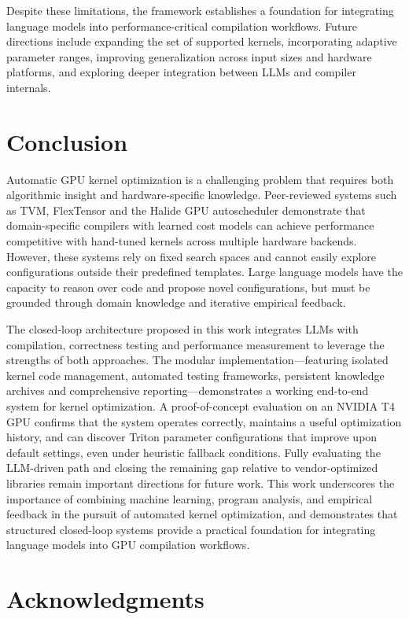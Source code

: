 \documentclass{article}
\begin{document}
Despite these limitations, the framework establishes a foundation for integrating language models into performance-critical compilation workflows. Future directions include expanding the set of supported kernels, incorporating adaptive parameter ranges, improving generalization across input sizes and hardware platforms, and exploring deeper integration between LLMs and compiler internals.

\section {Conclusion}
Automatic GPU kernel optimization is a challenging problem that requires both algorithmic insight and hardware-specific knowledge. Peer-reviewed systems such as TVM, FlexTensor and the Halide GPU autoscheduler demonstrate that domain-specific compilers with learned cost models can achieve performance competitive with hand-tuned kernels across multiple hardware backends. However, these systems rely on fixed search spaces and cannot easily explore configurations outside their predefined templates. Large language models have the capacity to reason over code and propose novel configurations, but must be grounded through domain knowledge and iterative empirical feedback.

The closed-loop architecture proposed in this work integrates LLMs with compilation, correctness testing and performance measurement to leverage the strengths of both approaches. The modular implementation—featuring isolated kernel code management, automated testing frameworks, persistent knowledge archives and comprehensive reporting—demonstrates a working end-to-end system for kernel optimization. A proof-of-concept evaluation on an NVIDIA T4 GPU confirms that the system operates correctly, maintains a useful optimization history, and can discover Triton parameter configurations that improve upon default settings, even under heuristic fallback conditions. Fully evaluating the LLM-driven path and closing the remaining gap relative to vendor-optimized libraries remain important directions for future work. This work underscores the importance of combining machine learning, program analysis, and empirical feedback in the pursuit of automated kernel optimization, and demonstrates that structured closed-loop systems provide a practical foundation for integrating language models into GPU compilation workflows.

\section*{Acknowledgments}
\end{document}
